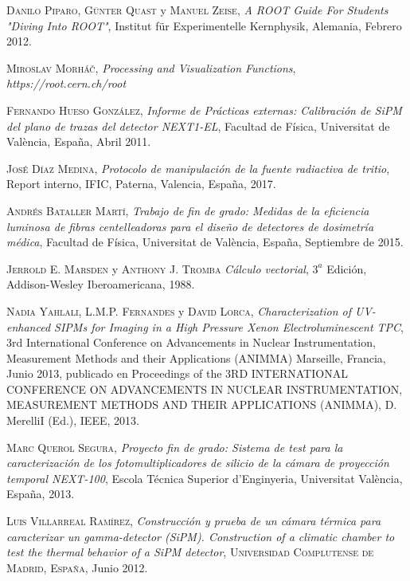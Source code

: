 \begin{thebibliography}{100}
 \textsc{Danilo Piparo}, \textsc{Günter Quast} y \textsc{Manuel Zeise},
\textit{A ROOT Guide For Students "Diving Into ROOT"}, Institut für Experimentelle Kernphysik, Alemania, Febrero 2012.

 \textsc{Miroslav Morháč},
\textit{Processing and Visualization Functions}, \textit{https://root.cern.ch/root}

 \textsc{Fernando Hueso González},
\textit{Informe de  Prácticas externas: Calibración de SiPM del plano de trazas del detector NEXT1-EL}, Facultad de Física, Universitat de  València, España, Abril 2011.

 \textsc{José Díaz Medina},
\textit{Protocolo de manipulación de la fuente radiactiva de tritio}, Report interno, IFIC, Paterna, Valencia, España, 2017.

 \textsc{Andrés Bataller Martí},
\textit{Trabajo de fin de grado: Medidas de la eficiencia luminosa de fibras centelleadoras para el diseño de detectores de dosimetría médica}, Facultad de Física, Universitat de València, España, Septiembre de 2015.

 \textsc{Jerrold E. Marsden} y \textsc{Anthony J. Tromba}
\textit{Cálculo vectorial}, $3^a$ Edición, Addison-Wesley Iberoamericana, 1988.

 \textsc{Nadia Yahlali}, \textsc{L.M.P. Fernandes} y \textsc{David Lorca},
\textit{Characterization of UV-enhanced SIPMs for Imaging in a High Pressure Xenon Electroluminescent TPC}, 
 3rd International Conference on Advancements in Nuclear Instrumentation, Measurement Methods and their Applications (ANIMMA)  Marseille, Francia, Junio 2013, publicado en Proceedings of the 3RD INTERNATIONAL CONFERENCE ON ADVANCEMENTS IN NUCLEAR INSTRUMENTATION, MEASUREMENT METHODS AND THEIR APPLICATIONS (ANIMMA), D. MerelliI (Ed.), IEEE, 2013.



 \textsc{Marc Querol Segura},
\textit{Proyecto fin de grado: Sistema de test para la caracterización de los fotomultiplicadores de silicio de la cámara de proyección temporal NEXT-100}, Escola Técnica Superior d'Enginyeria, Universitat València, España, 2013.

 \textsc{Luis Villarreal Ramírez},
\textit{Construcción y prueba de un cámara térmica para caracterizar un gamma-detector (SiPM). Construction of a climatic chamber to test the thermal behavior of a SiPM detector}, \textsc{Universidad Complutense de Madrid, España}, Junio 2012.
 
\end{thebibliography}